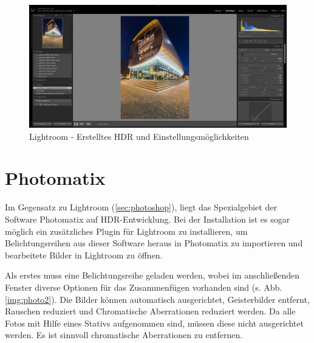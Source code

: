 \documentclass[liststotoc,bibtotoc,fontsize=14pt,]{scrreprt}
\begin{document}
		\bigskip
		\begin{figure}[H]
			\includegraphics[width=\linewidth]{img/lightroom3.png}
			\caption{Lightroom - Erstelltes HDR und Einstellungsmöglichkeiten}
			\label{img:light_3}
		\end{figure}
	
	\section{Photomatix}
	\label{sec:photomatix}
		Im Gegensatz zu Lightroom (\ref{sec:photoshop}), liegt das Spezialgebiet der Software Photomatix auf HDR-Entwicklung. Bei der Installation ist es sogar möglich ein zusätzliches Plugin für Lightroom zu installieren, um Belichtungsreihen aus dieser Software heraus in Photomatix zu importieren und bearbeitete Bilder in Lightroom zu öffnen.
		
		Als erstes muss eine Belichtungsreihe geladen werden, wobei im anschließenden Fenster diverse Optionen für das Zusammenfügen vorhanden sind (s. Abb. \ref{img:photo2}). Die Bilder können automatisch ausgerichtet, Geisterbilder entfernt, Rauschen reduziert und Chromatische Aberrationen reduziert werden. Da alle Fotos mit Hilfe eines Stativs aufgenommen sind, müssen diese nicht ausgerichtet werden. Es ist sinnvoll chromatische Aberrationen zu entfernen.
		
\end{document}
